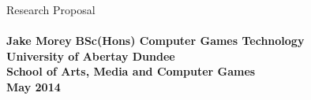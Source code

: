 \doublespacing
\begin{titlepage}
   \begin{center}
     Research Proposal\\
     \textbf{\\Jake Morey}
     \vfill
     \singlespacing
     \textbf{
     BSc(Hons) Computer Games Technology
     \\University of Abertay Dundee
     \\School of Arts, Media and Computer Games
     \\May 2014}
   \end{center}
\end{titlepage}
\doublespacing
\thispagestyle{empty}
\setcounter{page}{0}

\clearpage